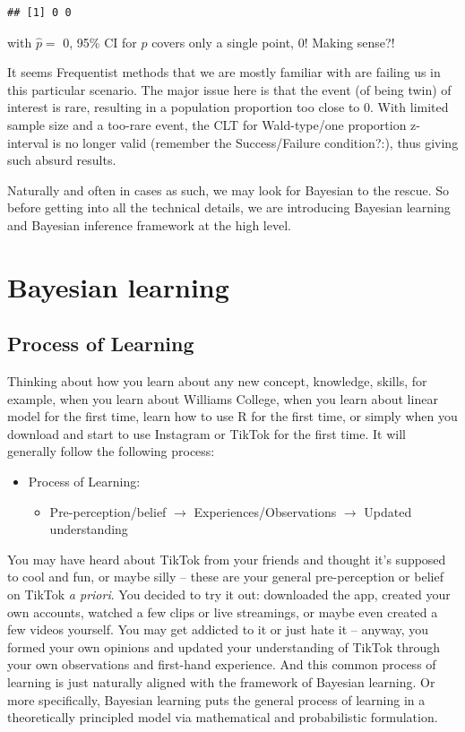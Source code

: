 \documentclass[
]{book}
\providecommand{\tightlist}{%
  \setlength{\itemsep}{0pt}\setlength{\parskip}{0pt}}
\begin{document}
\begin{verbatim}
## [1] 0 0
\end{verbatim}

with \(\hat{p}=\) 0, 95\% CI for \(p\) covers only a single point, 0! Making sense?!

It seems Frequentist methods that we are mostly familiar with are failing us in this particular scenario. The major issue here is that the event (of being twin) of interest is rare, resulting in a population proportion too close to \(0\). With limited sample size and a too-rare event, the CLT for Wald-type/one proportion z-interval is no longer valid (remember the Success/Failure condition?:), thus giving such absurd results.

Naturally and often in cases as such, we may look for Bayesian to the rescue. So before getting into all the technical details, we are introducing Bayesian learning and Bayesian inference framework at the high level.

\hypertarget{bayesian-learning}{%
\section{Bayesian learning}\label{bayesian-learning}}

\hypertarget{process-of-learning}{%
\subsection{Process of Learning}\label{process-of-learning}}

Thinking about how you learn about any new concept, knowledge, skills, for example, when you learn about Williams College, when you learn about linear model for the first time, learn how to use R for the first time, or simply when you download and start to use Instagram or TikTok for the first time. It will generally follow the following process:

\begin{itemize}
\tightlist
\item
  Process of Learning:

  \begin{itemize}
  \tightlist
  \item
    Pre-perception/belief \(\rightarrow\) Experiences/Observations \(\rightarrow\) Updated understanding
  \end{itemize}
\end{itemize}

You may have heard about TikTok from your friends and thought it's supposed to cool and fun, or maybe silly -- these are your general pre-perception or belief on TikTok \emph{a priori}. You decided to try it out: downloaded the app, created your own accounts, watched a few clips or live streamings, or maybe even created a few videos yourself. You may get addicted to it or just hate it -- anyway, you formed your own opinions and updated your understanding of TikTok through your own observations and first-hand experience. And this common process of learning is just naturally aligned with the framework of Bayesian learning. Or more specifically, Bayesian learning puts the general process of learning in a theoretically principled model via mathematical and probabilistic formulation.
\end{document}
